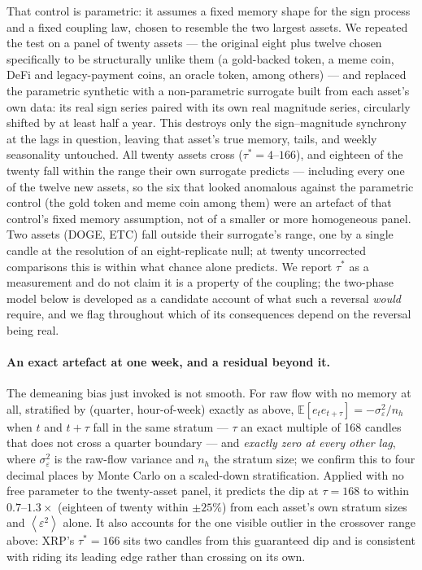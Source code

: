\documentclass[aps,pre,twocolumn,superscriptaddress,floatfix,nofootinbib]{revtex4-2}
\newcommand{\eps}{\varepsilon}
\newcommand{\avg}[1]{\left\langle #1 \right\rangle}
\begin{document}
That control is parametric: it assumes a fixed memory shape for the sign
process and a fixed coupling law, chosen to resemble the two largest assets.
We repeated the test on a panel of twenty assets --- the original eight plus
twelve chosen specifically to be structurally unlike them (a gold-backed
token, a meme coin, DeFi and legacy-payment coins, an oracle token, among
others) --- and replaced the parametric synthetic with a non-parametric
surrogate built from each asset's own data: its real sign series paired with
its own real magnitude series, circularly shifted by at least half a year.
This destroys only the sign--magnitude synchrony at the lags in question,
leaving that asset's true memory, tails, and weekly seasonality untouched.
All twenty assets cross ($\tau^{*}=4$--$166$), and eighteen of the twenty fall
within the range their own surrogate predicts --- including every one of the
twelve new assets, so the six that looked anomalous against the parametric
control (the gold token and meme coin among them) were an artefact of that
control's fixed memory assumption, not of a smaller or more homogeneous
panel. Two assets (DOGE, ETC) fall outside their surrogate's range, one by a
single candle at the resolution of an eight-replicate null; at twenty
uncorrected comparisons this is within what chance alone predicts. We report
$\tau^{*}$ as a measurement and do not claim it is a property of the coupling;
the two-phase model below is developed as a candidate account of what such a
reversal \emph{would} require, and we flag throughout which of its
consequences depend on the reversal being real.

\paragraph*{An exact artefact at one week, and a residual beyond it.}
The demeaning bias just invoked is not smooth. For raw flow with no memory at
all, stratified by (quarter, hour-of-week) exactly as above,
$\mathbb{E}[e_te_{t+\tau}]=-\sigma_\eps^2/n_h$ when $t$ and $t+\tau$ fall in the
same stratum --- $\tau$ an exact multiple of 168 candles that does not cross a
quarter boundary --- and \emph{exactly zero at every other lag}, where
$\sigma_\eps^2$ is the raw-flow variance and $n_h$ the stratum size; we confirm
this to four decimal places by Monte Carlo on a scaled-down stratification.
Applied with no free parameter to the twenty-asset panel, it predicts the dip
at $\tau=168$ to within $0.7$--$1.3\times$ (eighteen of twenty within
$\pm25\%$) from each asset's own stratum sizes and $\avg{\eps^2}$ alone. It
also accounts for the one visible outlier in the crossover range above: XRP's
$\tau^{*}=166$ sits two candles from this guaranteed dip and is consistent
with riding its leading edge rather than crossing on its own.
\end{document}

